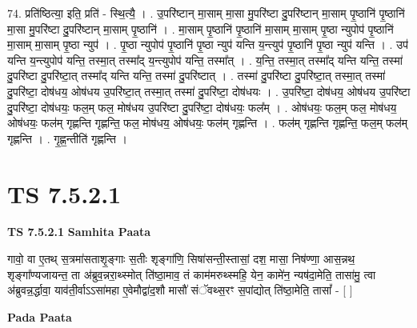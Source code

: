 \documentclass[17pt]{extarticle}
\begin{document}
74. प्रति॑ष्ठित्या॒ इति॒ प्रति॑ - स्थि॒त्यै॒ । . उ॒परि॑ष्टान् मा॒साम् मा॒सा मु॒परि॑ष्टा दु॒परि॑ष्टान् मा॒साम् पृ॒ष्ठानि॑ पृ॒ष्ठानि॑ मा॒सा मु॒परि॑ष्टा दु॒परि॑ष्टान् मा॒साम् पृ॒ष्ठानि॑ । . मा॒साम् पृ॒ष्ठानि॑ पृ॒ष्ठानि॑ मा॒साम् मा॒साम् पृ॒ष्ठा न्युपोप॑ पृ॒ष्ठानि॑ मा॒साम् मा॒साम् पृ॒ष्ठा न्युप॑ । . पृ॒ष्ठा न्युपोप॑ पृ॒ष्ठानि॑ पृ॒ष्ठा न्युप॑ यन्ति य॒न्त्युप॑ पृ॒ष्ठानि॑ पृ॒ष्ठा न्युप॑ यन्ति । . उप॑ यन्ति य॒न्त्युपोप॑ यन्ति॒ तस्मा॒त् तस्मा᳚द् य॒न्त्युपोप॑ यन्ति॒ तस्मा᳚त् । . य॒न्ति॒ तस्मा॒त् तस्मा᳚द् यन्ति यन्ति॒ तस्मा॑ दु॒परि॑ष्टा दु॒परि॑ष्टा॒त् तस्मा᳚द् यन्ति यन्ति॒ तस्मा॑ दु॒परि॑ष्टात् । . तस्मा॑ दु॒परि॑ष्टा दु॒परि॑ष्टा॒त् तस्मा॒त् तस्मा॑ दु॒परि॑ष्टा॒ दोष॑धय॒ ओष॑धय उ॒परि॑ष्टा॒त् तस्मा॒त् तस्मा॑ दु॒परि॑ष्टा॒ दोष॑धयः । . उ॒परि॑ष्टा॒ दोष॑धय॒ ओष॑धय उ॒परि॑ष्टा दु॒परि॑ष्टा॒ दोष॑धयः॒ फल॒म् फल॒ मोष॑धय उ॒परि॑ष्टा दु॒परि॑ष्टा॒ दोष॑धयः॒ फल᳚म् । . ओष॑धयः॒ फल॒म् फल॒ मोष॑धय॒ ओष॑धयः॒ फल॑म् गृह्णन्ति गृह्णन्ति॒ फल॒ मोष॑धय॒ ओष॑धयः॒ फल॑म् गृह्णन्ति । . फल॑म् गृह्णन्ति गृह्णन्ति॒ फल॒म् फल॑म् गृह्णन्ति । . गृ॒ह्ण॒न्तीति॑ गृह्णन्ति । \newline
\pagebreak
{}

\section{ TS 7.5.2.1 }

\textbf{TS 7.5.2.1 } \newline
\textbf{Samhita Paata} \newline

गावो॒ वा ए॒तथ् स॒त्रमा॑सताशृ॒ङ्गाः स॒तीः शृङ्गा॑णि॒ सिषा॑सन्ती॒स्तासां॒ दश॒ मासा॒ निष॑ण्णा॒ आस॒न्नथ॒ शृङ्गा᳚ण्यजायन्त॒ ता अ॑ब्रुव॒न्नरा॒थ्स्मोत् ति॑ष्ठा॒माव॒ तं काम॑मरुथ्स्महि॒ येन॒ कामे॑न॒ न्यष॑दा॒मेति॒ तासा॑मु॒ त्वा अ॑ब्रुवन्न॒र्द्धावा॒ याव॑ती॒र्वाऽऽसा॑महा ए॒वेमौद्वा॑द॒शौ मासौ॑ संॅवथ्स॒रꣳ स॒पांद्योत् ति॑ष्ठा॒मेति॒ तासां᳚ - [  ] \newline

\textbf{Pada Paata} \newline
\end{document}
